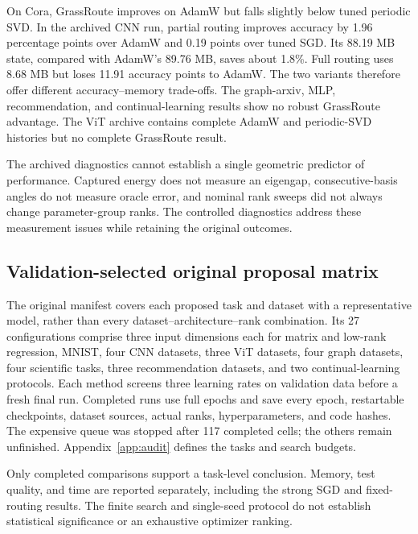 On Cora, GrassRoute improves on AdamW but falls slightly below tuned
periodic SVD. In the archived CNN run, partial routing improves accuracy by
1.96 percentage points over AdamW and 0.19 points over tuned SGD. Its
88.19 MB state, compared with AdamW's 89.76 MB, saves about 1.8\%.
Full routing uses 8.68 MB but loses 11.91 accuracy points to AdamW.
The two variants therefore offer different accuracy--memory trade-offs.
The graph-arxiv, MLP, recommendation, and continual-learning results show
no robust GrassRoute advantage. The ViT archive contains complete AdamW
and periodic-SVD histories but no complete GrassRoute result.

The archived diagnostics cannot establish a single geometric predictor of
performance. Captured energy does not measure an eigengap, consecutive-basis
angles do not measure oracle error, and nominal rank sweeps did not always
change parameter-group ranks. The controlled diagnostics address these
measurement issues while retaining the original outcomes.

\subsection{Validation-selected original proposal matrix}



The original manifest covers each proposed task and dataset with a
representative model, rather than every dataset--architecture--rank
combination. Its 27 configurations comprise three input dimensions each
for matrix and low-rank regression, MNIST, four CNN datasets, three ViT
datasets, four graph datasets, four scientific tasks, three recommendation
datasets, and two continual-learning protocols. Each method screens three
learning rates on validation data before a fresh final run. Completed runs
use full epochs and save every epoch, restartable checkpoints, dataset
sources, actual ranks, hyperparameters, and code hashes. The expensive queue
was stopped after 117 completed cells; the others remain unfinished.
Appendix~\ref{app:audit} defines the tasks and search budgets.



Only completed comparisons support a task-level conclusion. Memory, test
quality, and time are reported separately, including the strong SGD and
fixed-routing results. The finite search and single-seed protocol do not
establish statistical significance or an exhaustive optimizer ranking.

